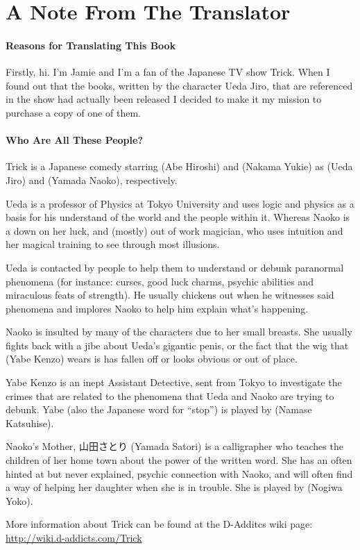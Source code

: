 \chapter*{A Note From The Translator}
\subsubsection{Reasons for Translating This Book}
Firstly, hi. I'm Jamie and I'm a fan of the Japanese TV show Trick. When I found out that the books, written by the character Ueda Jiro, that are referenced in the show had actually been released I decided to make it my mission to purchase a copy of one of them.
\subsubsection{Who Are All These People?}
Trick is a Japanese comedy starring  (Abe Hiroshi) and  (Nakama Yukie) as  (Ueda Jiro) and  (Yamada Naoko), respectively.
\par Ueda is a professor of Physics at Tokyo University and uses logic and physics as a basis for his understand of the world and the people within it. Whereas Naoko is a down on her luck, and (mostly) out of work magician, who uses intuition and her magical training to see through most illusions.
\par Ueda is contacted by people to help them to understand or debunk paranormal phenomena (for instance: curses, good luck charms, psychic abilities and miraculous feats of strength). He usually chickens out when he witnesses said phenomena and implores Naoko to help him explain what's happening.
\par Naoko is insulted by many of the characters due to her small breasts. She usually fights back with a jibe about Ueda's gigantic penis, or the fact that the wig that  (Yabe Kenzo) wears is has fallen off or looks obvious or out of place.
\par Yabe Kenzo is an inept Assistant Detective, sent from Tokyo to investigate the crimes that are related to the phenomena that Ueda and Naoko are trying to debunk. Yabe (also the Japanese word for ``stop'') is played by  (Namase Katsuhise).
\par Naoko's Mother, 山田さとり (Yamada Satori) is a calligrapher who teaches the children of her home town about the power of the written word. She has an often hinted at but never explained, psychic connection with Naoko, and will often find a way of helping her daughter when she is in trouble. She is played by  (Nogiwa Yoko).
\par More information about Trick can be found at the D-Additcs wiki page: \url{http://wiki.d-addicts.com/Trick}